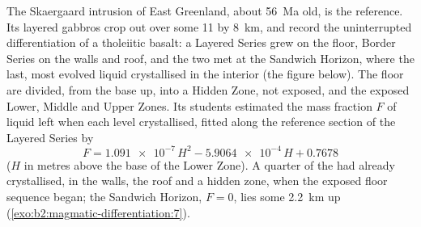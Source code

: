 The Skaergaard intrusion of East Greenland, about \qty{56}{Ma} old, is the
reference. Its layered gabbros crop out over some 11 by \qty{8}{km}, and record the
uninterrupted differentiation of a tholeiitic basalt: a Layered Series grew on the
floor, Border Series on the walls and roof, and the two met at the Sandwich Horizon,
where the last, most evolved liquid crystallised in the interior (the figure below).
The floor  are divided, from the base up, into a Hidden Zone, not exposed,
and the exposed Lower, Middle and Upper Zones. Its
students estimated the mass fraction $F$ of liquid left when each level crystallised, fitted
along the reference section of the Layered Series by
\[
F = \num{1.091e-7}\,H^2 - \num{5.9064e-4}\,H + 0.7678
\]
($H$ in metres above the base of the Lower Zone). A quarter of the  had already
crystallised, in the walls, the roof and a hidden zone, when the exposed floor
sequence began; the Sandwich Horizon, $F = 0$, lies some \qty{2.2}{km} up
(\cref{exo:b2:magmatic-differentiation:7}).

